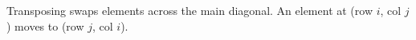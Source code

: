 \documentclass[preview]{standalone}
\begin{document}
\begin{center}
Transposing swaps elements across the main diagonal. An element at (row $i$, col $j$) moves to (row $j$, col $i$).
\end{center}
\end{document}
